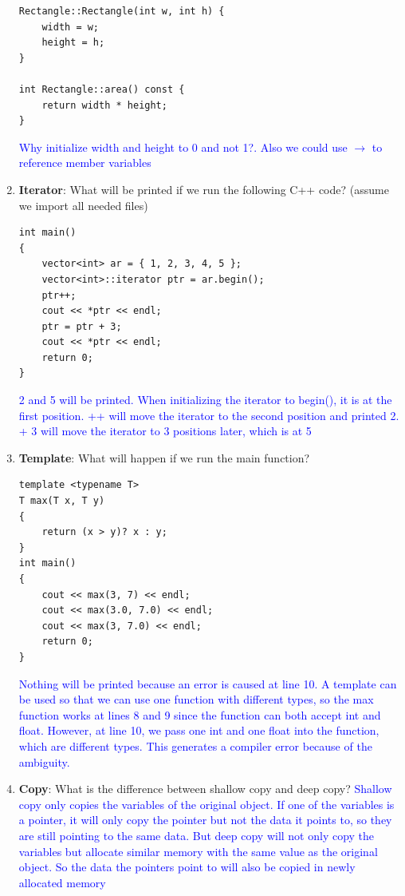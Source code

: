 \documentclass{article}
\begin{document}
\begin{enumerate}[label=(\alph*)]
\begin{lstlisting}[style=CStyle]
Rectangle::Rectangle(int w, int h) {
    width = w;
    height = h;
}

int Rectangle::area() const {
    return width * height;
}\end{lstlisting}

\textcolor{blue}{Why initialize width and height to 0 and not 1?. Also  we could use $\rightarrow{}$ to reference member variables}
    \item \textbf{Iterator}: What will be printed if we run the following C++ code? (assume we import all needed files)
    \begin{lstlisting}[style=CStyle]
    int main() 
{ 
    vector<int> ar = { 1, 2, 3, 4, 5 }; 
    vector<int>::iterator ptr = ar.begin(); 
    ptr++;
    cout << *ptr << endl; 
    ptr = ptr + 3;
    cout << *ptr << endl; 
    return 0; 
}
\end{lstlisting}
\textcolor{blue}{2 and 5 will be printed. When initializing the iterator to begin(), it is at the first position. ++ will move the iterator to the second position and printed 2. + 3 will move the iterator to 3 positions later, which is at 5}
    \item \textbf{Template}: What will happen if we run the main function?
    \begin{lstlisting}[style=CStyle]
template <typename T>
T max(T x, T y)
{
    return (x > y)? x : y;
}
int main()
{
    cout << max(3, 7) << endl;
    cout << max(3.0, 7.0) << endl;
    cout << max(3, 7.0) << endl;
    return 0;
}
\end{lstlisting}
\textcolor{blue}{Nothing will be printed because an error is caused at line 10. A template can be used so that we can use one function with different types, so the max function works at lines 8 and 9 since the function can both accept int and float. However, at line 10, we pass one int and one float into the function, which are different types. This generates a compiler error because of the ambiguity.}
    \item \textbf{Copy}: What is the difference between shallow copy and deep copy?
\newline\textcolor{blue}{Shallow copy only copies the variables of the original object. If one of the variables is a pointer, it will only copy the pointer but not the data it points to, so they are still pointing to the same data. But deep copy will not only copy the variables but allocate similar memory with the same value as the original object. So the data the pointers point to will also be copied in newly allocated memory}


\end{enumerate}
\end{document}
